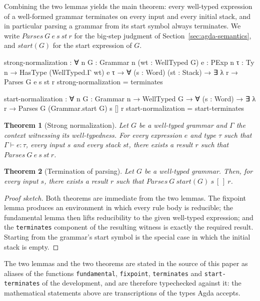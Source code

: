 \documentclass[preprint,12pt]{elsarticle}
\newtheorem{Theorem}{Theorem}
\theoremstyle{definition}
\newenvironment{proofsketch}
  {\renewcommand{\qedsymbol}{$\blacksquare$}\begin{proof}[Proof sketch]}
  {\end{proof}}
\begin{document}
Combining the two lemmas yields the main theorem: every well-typed expression of
a well-formed grammar terminates on every input and every initial stack, and in
particular parsing a grammar from its start symbol always terminates. We write
$\mathit{Parses}\ G\ e\ s\ st\ r$ for the big-step judgment of
Section~\ref{sec:agda-semantics}, and $\mathit{start}(G)$ for the start
expression of $G$.

\begin{code}[hide]
strong-normalization
  : ∀ {n} {G : Grammar n} (wt : WellTyped G)
    {e : PExp n} {τ : Ty n}
  → HasType (WellTyped.Γ wt) e τ
  → ∀ (s : Word) (st : Stack) → ∃ λ r → Parses G e s st r
strong-normalization = terminates

start-normalization
  : ∀ {n} {G : Grammar n} → WellTyped G
  → ∀ (s : Word) → ∃ λ r → Parses G (Grammar.start G) s [] r
start-normalization = start-terminates
\end{code}

\begin{Theorem}[Strong normalization]\label{thm:sn-pest}
Let $G$ be a well-typed grammar and $\Gamma$ the context witnessing its
well-typedness. For every expression $e$ and type $\tau$ such that
$\Gamma \vdash e : \tau$, every input $s$ and every stack $st$, there exists a
result $r$ such that $\mathit{Parses}\ G\ e\ s\ st\ r$.
\end{Theorem}

\begin{Theorem}[Termination of parsing]\label{thm:start-pest}
Let $G$ be a well-typed grammar. Then, for every input $s$, there exists a result
$r$ such that $\mathit{Parses}\ G\ \mathit{start}(G)\ s\ [\,]\ r$.
\end{Theorem}

\begin{proofsketch}
Both theorems are immediate from the two lemmas. The fixpoint
lemma produces an environment in which every rule body is reducible; the
fundamental lemma then lifts reducibility to the given well-typed expression; and
the \lstinline{terminates} component of the resulting witness is exactly the
required result. Starting from the grammar's start symbol is the special case in
which the initial stack is empty.
\end{proofsketch}

The two lemmas and the two theorems are stated in the source of this paper as
aliases of the functions \lstinline{fundamental}, \lstinline{fixpoint},
\lstinline{terminates} and \lstinline{start-terminates} of the development, and
are therefore typechecked against it: the mathematical statements above are
transcriptions of the types Agda accepts.
\end{document}
